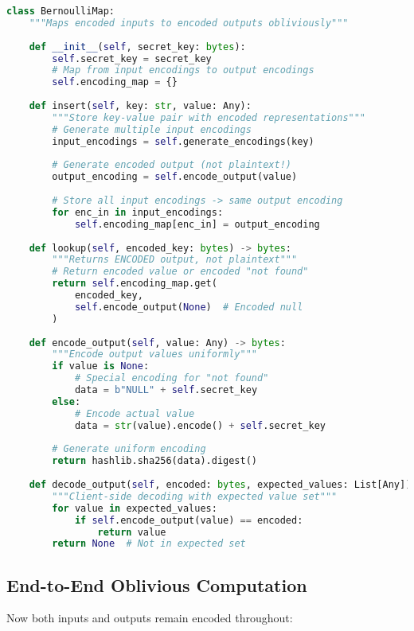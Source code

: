\begin{lstlisting}[language=Python, caption={Bernoulli map with encoded outputs}]
class BernoulliMap:
    """Maps encoded inputs to encoded outputs obliviously"""
    
    def __init__(self, secret_key: bytes):
        self.secret_key = secret_key
        # Map from input encodings to output encodings
        self.encoding_map = {}
        
    def insert(self, key: str, value: Any):
        """Store key-value pair with encoded representations"""
        # Generate multiple input encodings
        input_encodings = self.generate_encodings(key)
        
        # Generate encoded output (not plaintext!)
        output_encoding = self.encode_output(value)
        
        # Store all input encodings -> same output encoding
        for enc_in in input_encodings:
            self.encoding_map[enc_in] = output_encoding
    
    def lookup(self, encoded_key: bytes) -> bytes:
        """Returns ENCODED output, not plaintext"""
        # Return encoded value or encoded "not found"
        return self.encoding_map.get(
            encoded_key,
            self.encode_output(None)  # Encoded null
        )
    
    def encode_output(self, value: Any) -> bytes:
        """Encode output values uniformly"""
        if value is None:
            # Special encoding for "not found"
            data = b"NULL" + self.secret_key
        else:
            # Encode actual value
            data = str(value).encode() + self.secret_key
        
        # Generate uniform encoding
        return hashlib.sha256(data).digest()
    
    def decode_output(self, encoded: bytes, expected_values: List[Any]) -> Any:
        """Client-side decoding with expected value set"""
        for value in expected_values:
            if self.encode_output(value) == encoded:
                return value
        return None  # Not in expected set
\end{lstlisting}

\subsection{End-to-End Oblivious Computation}

Now both inputs and outputs remain encoded throughout:

